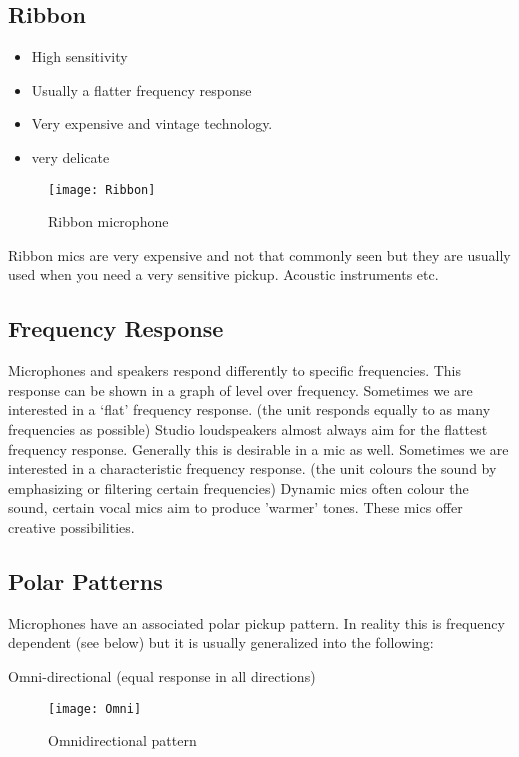 \subsection{Ribbon}
\begin{itemize}
\item High sensitivity
\item Usually a flatter frequency response
\item Very expensive and vintage technology.
\item very delicate
\end{itemize}

\begin{figure}[H]
\centering
\texttt{[image: Ribbon]}\caption{Ribbon microphone}
\label{fig:ribbon}
\end{figure}

Ribbon mics are very expensive and not that commonly seen but they are usually used when you need a very sensitive pickup. Acoustic instruments etc.

\subsection{Frequency Response}
Microphones and speakers respond differently to specific frequencies.
This response can be shown in a graph of level over frequency.
Sometimes we are interested in a `flat' frequency response. (the unit responds equally to as many frequencies as possible)
Studio loudspeakers almost always aim for the flattest frequency response. Generally this is desirable in a mic as well.
Sometimes we are interested in a characteristic frequency response. (the unit colours the sound by emphasizing or filtering certain frequencies)
Dynamic mics often colour the sound, certain vocal mics aim to produce 'warmer' tones. These mics offer creative possibilities.

\subsection{Polar Patterns}
Microphones have an associated polar pickup pattern. In reality this is frequency dependent (see below) but it is usually generalized into the following:

Omni-directional (equal response in all directions)

\begin{figure}[H]
\centering
\texttt{[image: Omni]}\caption{Omnidirectional pattern}
\label{fig:omni}
\end{figure}

